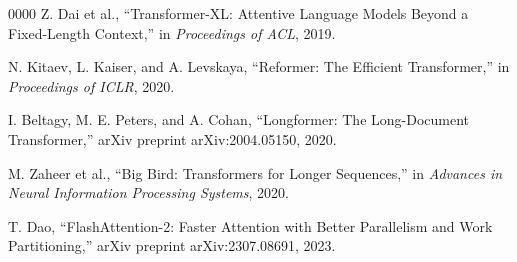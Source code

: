 \documentclass[conference]{IEEEtran}
\begin{document}
\begin{thebibliography}{00}{00}
Z. Dai et al., ``Transformer-XL: Attentive Language Models Beyond a Fixed-Length Context,'' in \textit{Proceedings of ACL}, 2019.

N. Kitaev, L. Kaiser, and A. Levskaya, ``Reformer: The Efficient Transformer,'' in \textit{Proceedings of ICLR}, 2020.

I. Beltagy, M. E. Peters, and A. Cohan, ``Longformer: The Long-Document Transformer,'' arXiv preprint arXiv:2004.05150, 2020.

M. Zaheer et al., ``Big Bird: Transformers for Longer Sequences,'' in \textit{Advances in Neural Information Processing Systems}, 2020.

T. Dao, ``FlashAttention-2: Faster Attention with Better Parallelism and Work Partitioning,'' arXiv preprint arXiv:2307.08691, 2023.


\end{thebibliography}
\end{document}
